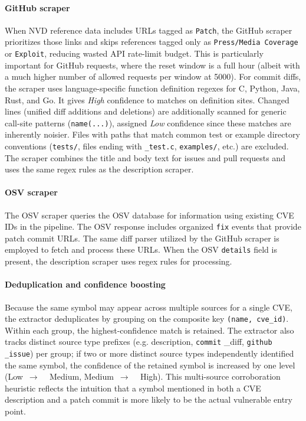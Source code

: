 \documentclass[conference]{IEEEtran}
\begin{document}
\paragraph{GitHub scraper}
When NVD reference data includes URLs tagged as \texttt{Patch}, the GitHub scraper prioritizes those links and skips references tagged only as \texttt{Press/Media~Coverage} or \texttt{Exploit}, reducing wasted API rate-limit budget. This is particularly important for GitHub requests, where the reset window is a full hour (albeit with a much higher number of allowed requests per window at 5000)\cite{github_rate_limits}. For commit diffs, the scraper uses language-specific function definition regexes for C, Python, Java, Rust, and Go. It gives \textit{High} confidence to matches on definition sites. Changed lines (unified diff additions and deletions) are additionally scanned for generic call-site patterns (\texttt{name(...)}), assigned \textit{Low} confidence since these matches are inherently noisier. Files with paths that match common test or example directory conventions (\texttt{tests/}, files ending with \texttt{\_test.c}, \texttt{examples/}, etc.) are excluded. The scraper combines the title and body text for issues and pull requests and uses the same regex rules as the description scraper.

\paragraph{OSV scraper}
The OSV scraper queries the OSV database for information using existing CVE IDs in the pipeline. The OSV response includes organized \texttt{fix} events that provide patch commit URLs. The same diff parser utilized by the GitHub scraper is employed to fetch and process these URLs. When the OSV \texttt{details} field is present, the description scraper uses regex rules for processing.

\paragraph{Deduplication and confidence boosting}
Because the same symbol may appear across multiple sources for a single CVE, the extractor deduplicates by grouping on the composite key \texttt{(name, cve\_id)}. Within each group, the highest-confidence match is retained. The extractor also tracks distinct source type prefixes (e.g. description, \texttt{commit} \_diff, \texttt{github} \texttt{\_issue}) per group; if two or more distinct source types independently identified the same symbol, the confidence of the retained symbol is increased by one level (Low~$\to$ ~ Medium, Medium~$\to$ ~ High). This multi-source corroboration heuristic reflects the intuition that a symbol mentioned in both a CVE description and a patch commit is more likely to be the actual vulnerable entry point.
\end{document}
